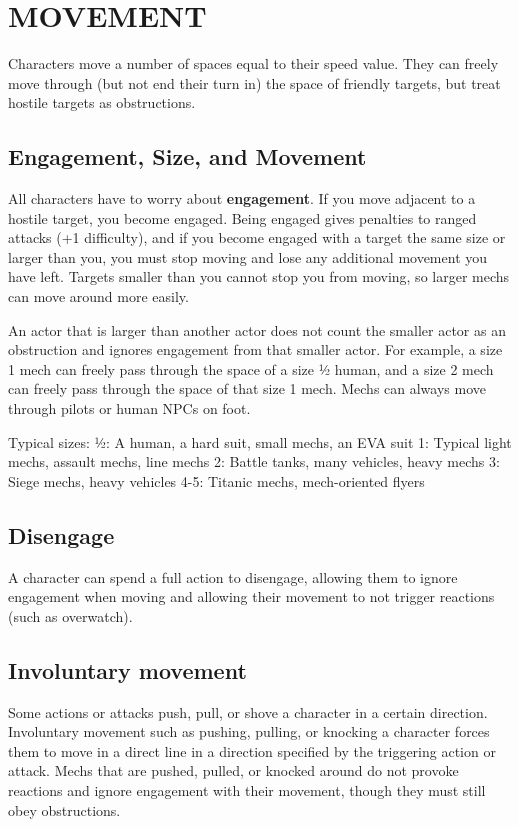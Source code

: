 \section{MOVEMENT}

Characters move a number of spaces equal to their speed value. They can freely move through (but not end their turn in) the space of friendly targets, but treat hostile targets as obstructions. 

\subsection{Engagement, Size, and Movement}

All characters have to worry about \textbf{engagement}. If you move adjacent to a hostile target, you become engaged. Being engaged gives penalties to ranged attacks (+1 difficulty), and if you become engaged with a target the same size or larger than you, you must stop moving and lose any additional movement you have left. Targets smaller than you cannot stop you from moving, so larger mechs can move around more easily.

An actor that is larger than another actor does not count the smaller actor as an obstruction and ignores engagement from that smaller actor. For example, a size 1 mech can freely pass through the space of a size ½ human, and a size 2 mech can freely pass through the space of that size 1 mech. Mechs can always move through pilots or human NPCs on foot.

Typical sizes:
½: A human, a hard suit, small mechs, an EVA suit
1: Typical light mechs, assault mechs, line mechs
2: Battle tanks, many vehicles, heavy mechs
3: Siege mechs, heavy vehicles
4-5: Titanic mechs, mech-oriented flyers

\subsection{Disengage}
A character can spend a full action to disengage, allowing them to ignore engagement when moving and allowing their movement to not trigger reactions (such as overwatch).

\subsection{Involuntary movement}
Some actions or attacks push, pull, or shove a character in a certain direction. Involuntary movement such as pushing, pulling, or knocking a character forces them to move in a direct line in a direction specified by the triggering action or attack. Mechs that are pushed, pulled, or knocked around do not provoke reactions and ignore engagement with their movement, though they must still obey obstructions.

